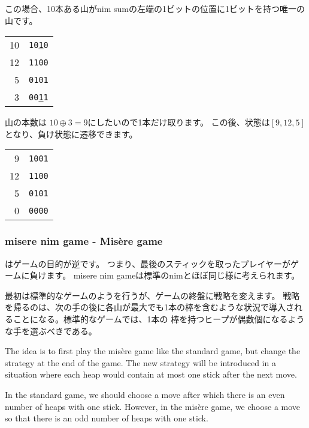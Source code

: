 この場合、10本ある山がnim sumの左端の1ビットの位置に1ビットを持つ唯一の山です。

\begin{center}
\begin{tabular}{r|r}
10 & \texttt{10\underline{1}0} \\
12 & \texttt{1100} \\
5 & \texttt{0101} \\
\hline
3 & \texttt{00\underline{1}1} \\
\end{tabular}
\end{center}

山の本数は $10 \oplus 3 = 9$にしたいので1本だけ取ります。
この後、状態は$[9, 12, 5]$となり、負け状態に遷移できます。

\begin{center}
\begin{tabular}{r|r}
9 & \texttt{1001} \\
12 & \texttt{1100} \\
5 & \texttt{0101} \\
\hline
0 & \texttt{0000} \\
\end{tabular}
\end{center}

\subsubsection{misere nim game - Misère game}


はゲームの目的が逆です。
つまり、最後のスティックを取ったプレイヤーがゲームに負けます。
misere nim gameは標準のnimとほぼ同じ様に考えられます。

最初は標準的なゲームのようを行うが、ゲームの終盤に戦略を変えます。
戦略を帰るのは、次の手の後に各山が最大でも1本の棒を含むような状況で導入されることになる。標準的なゲームでは、1本の
棒を持つヒープが偶数個になるような手を選ぶべきである。

The idea is to first play the misère game
like the standard game, but change the strategy
at the end of the game.
The new strategy will be introduced in a situation
where each heap would contain at most one stick
after the next move.

In the standard game, we should choose a move
after which there is an even number of heaps with one stick.
However, in the misère game, we choose a move so that
there is an odd number of heaps with one stick.

